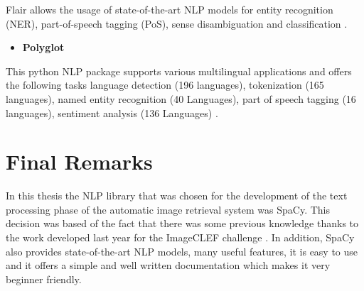         Flair allows the usage of state-of-the-art NLP models for entity recognition (NER), part-of-speech tagging (PoS), sense disambiguation and classification \cite{akbik2018coling}.
        
        \begin{itemize}
            \item\textbf{Polyglot}
        \end{itemize}
       

        This python NLP package supports various multilingual applications and offers the following tasks
        language detection (196 languages), tokenization (165 languages), named entity recognition (40 Languages), part of speech tagging (16 languages), sentiment analysis (136 Languages) \cite{polyglot:2013:ACL-CoNLL}.
    


        
        \section{Final Remarks}
        \label{sec:final_remarks}

        In this thesis the NLP library that was chosen for the development of the text processing phase of the automatic image retrieval system was SpaCy. This decision was based of the fact that there was some previous knowledge thanks to the work developed last year for the ImageCLEF challenge \cite{Ribeiro2019}. In addition, SpaCy also provides state-of-the-art NLP models, many useful features, it is easy to use and it offers a simple and well written documentation which makes it very beginner friendly. 
        
        
